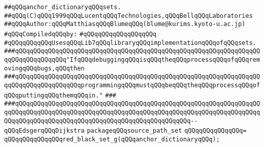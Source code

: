 \label{src/app/makelib/paths/source-path-set.pkg}
\verb|##qQQqanchor_dictionaryqQQqsets.|\newline
\verb|##qQQq(C)qQQq1999qQQqLucentqQQqTechnologies,qQQqBellqQQqLaboratories|\newline
\verb|##qQQqAuthor:qQQqMatthiasqQQqBlumeqQQq(blume@kurims.kyoto-u.ac.jp)|\newline
\newline
\verb|#qQQqCompiledqQQqby:|\newline
\verb|#qQQqqQQqqQQqqQQqqQQq|\newline
\newline
\newline
\verb|#qQQqqQQqqQQqUsesqQQqLib7qQQqlibraryqQQqimplementationqQQqofqQQqsets.|\newline
\newline
\newline
\newline
\verb|###qQQqqQQqqQQqqQQqqQQqqQQqqQQqqQQqqQQqqQQqqQQqqQQqqQQqqQQqqQQqqQQqqQQqqQQqqQQqqQQqqQQq"IfqQQqdebuggingqQQqisqQQqtheqQQqprocessqQQqofqQQqremovingqQQqbugs,qQQqthen|\newline
\verb|###qQQqqQQqqQQqqQQqqQQqqQQqqQQqqQQqqQQqqQQqqQQqqQQqqQQqqQQqqQQqqQQqqQQqqQQqqQQqqQQqqQQqqQQqprogrammingqQQqmustqQQqbeqQQqtheqQQqprocessqQQqofqQQqputtingqQQqthemqQQqin."|\newline
\verb|###|\newline
\verb|###qQQqqQQqqQQqqQQqqQQqqQQqqQQqqQQqqQQqqQQqqQQqqQQqqQQqqQQqqQQqqQQqqQQqqQQqqQQqqQQqqQQqqQQqqQQqqQQqqQQqqQQqqQQqqQQqqQQqqQQqqQQqqQQqqQQqqQQqqQQqqQQqqQQqqQQqqQQqqQQqqQQqqQQqqQQqqQQqqQQqqQQqqQQq--qQQqEdsgerqQQqDijkstra|\newline
\newline
\newline
\newline
\verb|packageqQQqsource_path_set|\newline
\verb|qQQqqQQqqQQqqQQq=|\newline
\verb|qQQqqQQqqQQqqQQqred_black_set_g(qQQqanchor_dictionaryqQQq);|\newline

